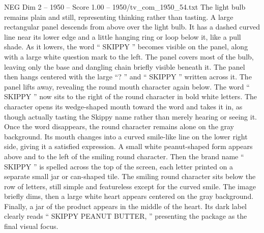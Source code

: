 \begin{textsample}{NEG Dim 2 – 1950 – Score 1.00 – 1950/tv\_com\_1950\_54.txt}
The light bulb remains plain and still, representing thinking rather than tasting.
A large rectangular panel descends from above over the light bulb.
It has a dashed curved line near its lower edge and a little hanging ring or loop below it, like a pull shade.
As it lowers, the word “ SKIPPY ” becomes visible on the panel, along with a large white question mark to the left.
The panel covers most of the bulb, leaving only the base and dangling chain briefly visible beneath it.
The panel then hangs centered with the large “? ” and “ SKIPPY ” written across it.
The panel lifts away, revealing the round mouth character again below.
The word “ SKIPPY ” now sits to the right of the round character in bold white letters.
The character opens its wedge-shaped mouth toward the word and takes it in, as though actually tasting the Skippy name rather than merely hearing or seeing it.
Once the word disappears, the round character remains alone on the gray background.
Its mouth changes into a curved smile-like line on the lower right side, giving it a satisfied expression.
A small white peanut-shaped form appears above and to the left of the smiling round character.
Then the brand name “ SKIPPY ” is spelled across the top of the screen, each letter printed on a separate small jar or can-shaped tile.
The smiling round character sits below the row of letters, still simple and featureless except for the curved smile.
The image briefly dims, then a large white heart appears centered on the gray background.
Finally, a jar of the product appears in the middle of the heart.
Its dark label clearly reads “ SKIPPY PEANUT BUTTER, ” presenting the package as the final visual focus.

\end{textsample}
